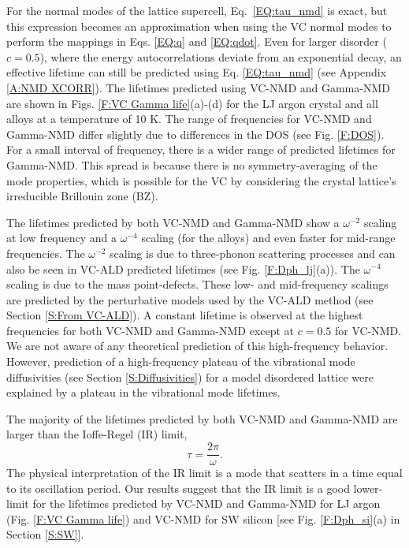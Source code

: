 \documentclass[aps,prb,onecolumn,preprint,footinbib,superscriptaddress,amsmath,amssymb,floatfix]{revtex4}
\begin{document}
For the normal modes of the lattice supercell, 
Eq.~\eqref{EQ:tau_nmd} is exact, but this expression becomes an 
approximation when 
using the VC normal modes to perform the mappings in Eqs.  
\eqref{EQ:q} and \eqref{EQ:qdot}. 
Even for larger disorder ($c=0.5$),  
where the energy autocorrelations 
deviate from an exponential decay, 
an effective lifetime can still be predicted 
using Eq. \eqref{EQ:tau_nmd} (see Appendix \ref{A:NMD XCORR}). 
The lifetimes predicted using VC-NMD and Gamma-NMD  
are shown in Figs. \ref{F:VC Gamma life}(a)-(d) 
for the LJ argon crystal and all alloys at a temperature of 10 K. 
The range of frequencies for 
VC-NMD and Gamma-NMD differ slightly due to differences in 
the DOS (see Fig. \ref{F:DOS}). 
For a small interval of frequency, there is a wider range of 
predicted lifetimes for Gamma-NMD. This spread is because there 
is no symmetry-averaging of the mode properties, 
which is possible for the VC by considering the crystal 
lattice's irreducible Brillouin zone (BZ).\cite{ashcroft_solid_1976} 

The lifetimes predicted by both VC-NMD and Gamma-NMD 
show a $\omega^{-2}$ scaling at low frequency and a $\omega^{-4}$ 
scaling (for the alloys) and 
even faster for mid-range frequencies. The $\omega^{-2}$ scaling 
is due to three-phonon scattering processes
\cite{callaway_model_1959,maradudin_scattering_1962} and can also be seen in 
VC-ALD predicted lifetimes (see Fig. \ref{F:Dph_lj}(a)). The 
$\omega^{-4}$ scaling is due to the mass point-defects. 
These low- and mid-frequency 
scalings are predicted by the perturbative models used by 
the VC-ALD method (see Section \ref{S:From VC-ALD}). 
A constant lifetime is observed at the highest frequencies  
for both VC-NMD and Gamma-NMD except at $c=0.5$ for VC-NMD. We are not 
aware of any theoretical prediction of this high-frequency behavior. However, 
prediction of a high-frequency plateau of the vibrational mode diffusivities 
(see Section \ref{S:Diffusivities}) for a model disordered lattice were 
explained by a plateau in the vibrational mode lifetimes.\cite{sheng_heat_1991} 

The majority of the lifetimes predicted by both VC-NMD and 
Gamma-NMD are larger than the Ioffe-Regel (IR) limit,
\cite{taraskin_determination_1999} 
\begin{equation}\label{EQ:IR}
\tau = \frac{2\pi}{\omega}.
\end{equation}
The physical interpretation of the IR limit is a mode that  
scatters in a time equal to its oscillation period. Our results suggest 
that the IR limit is a good lower-limit for the lifetimes predicted 
by VC-NMD and Gamma-NMD 
for LJ argon (Fig. \ref{F:VC Gamma life}) 
and VC-NMD for SW silicon [see Fig. \ref{F:Dph_si}(a) in 
Section \ref{S:SW}]. 
\end{document}
